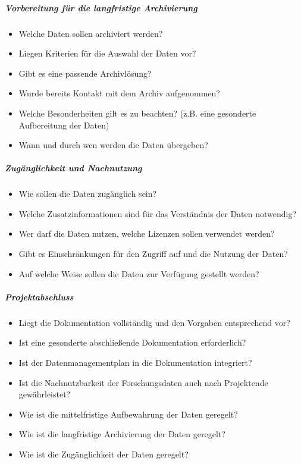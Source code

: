 \subparagraph{Vorbereitung für die langfristige Archivierung}
\begin{itemize}
    \item Welche Daten sollen archiviert werden?
    \item Liegen Kriterien für die Auswahl der Daten vor?
    \item Gibt es eine passende Archivlösung?
    \item Wurde bereits Kontakt mit dem Archiv aufgenommen?
    \item Welche Besonderheiten gilt es zu beachten? (z.B. eine gesonderte Aufbereitung der Daten)
    \item Wann und durch wen werden die Daten übergeben?
\end{itemize}

\subparagraph{Zugänglichkeit und Nachnutzung}
\begin{itemize}
    \item Wie sollen die Daten zugänglich sein?
    \item Welche Zusatzinformationen sind für das Verständnis der Daten notwendig?
    \item Wer darf die Daten nutzen, welche Lizenzen sollen verwendet werden?
    \item Gibt es Einschränkungen für den Zugriff auf und die Nutzung der Daten?
    \item Auf welche Weise sollen die Daten zur Verfügung gestellt werden?
\end{itemize}

\subparagraph{Projektabschluss}
\begin{itemize}
    \item Liegt die Dokumentation vollständig und den Vorgaben entsprechend vor?
    \item Ist eine gesonderte abschließende Dokumentation erforderlich?
    \item Ist der Datenmanagementplan in die Dokumentation integriert?
    \item Ist die Nachnutzbarkeit der Forschungsdaten auch nach Projektende gewährleistet?
    \item Wie ist die mittelfristige Aufbewahrung der Daten geregelt?
    \item Wie ist die langfristige Archivierung der Daten geregelt?
    \item Wie ist die Zugänglichkeit der Daten geregelt?
\end{itemize}


